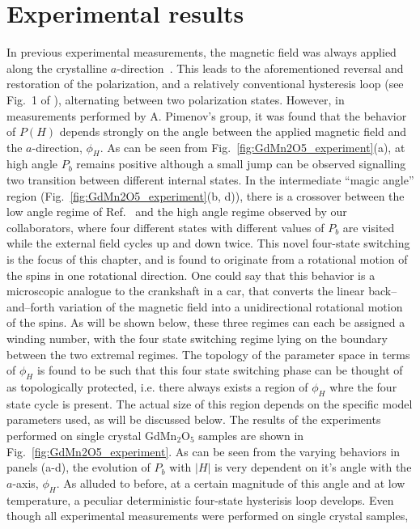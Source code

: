 \section{Experimental results}
In previous experimental measurements, the magnetic field was always applied along the crystalline $a$-direction~\cite{Lee13}.
This leads to the aforementioned reversal and restoration of the polarization, and a relatively conventional hysteresis loop (see Fig.~1 of \cite{Lee13}), alternating between two polarization states. However, in measurements performed by A. Pimenov's group, it was found that the behavior of $P(H)$ depends strongly on the angle between the applied magnetic field and the $a$-direction, $\phi_H$.
As can be seen from Fig.~\ref{fig:GdMn2O5_experiment}(a), at high angle $P_b$ remains positive although a small jump can be observed signalling two transition between different internal states.
In the intermediate ``magic angle'' region (Fig.~\ref{fig:GdMn2O5_experiment}(b, d)), there is a crossover between the low angle regime of Ref.~\cite{Lee13} and the high angle regime observed by our collaborators, where four different states with different values of $P_b$ are visited while the external field cycles up and down twice.
This novel four-state switching is the focus of this chapter, and is found to originate from a rotational motion of the spins in one rotational direction.
One could say that this behavior is a microscopic analogue to the crankshaft in a car, that converts the linear back--and--forth variation of the magnetic field into a unidirectional rotational motion of the spins.
As will be shown below, these three regimes can each be assigned a winding number, with the four state switching regime lying on the boundary between the two extremal regimes.
The topology of the parameter space in terms of $\phi_H$ is found to be such that this four state switching phase can be thought of as topologically protected, i.e. there always exists a region of $\phi_H$ whre the four state cycle is present. The actual size of this region depends on the specific model parameters used, as will be discussed below.
The results of the experiments performed on single crystal GdMn$_2$O$_5$ samples are shown in Fig.~\ref{fig:GdMn2O5_experiment}. As can be seen from the varying behaviors in panels (a-d), the evolution of $P_b$ with $|H|$ is very dependent on it's angle with the $a$-axis, $\phi_H$.
As alluded to before, at a certain magnitude of this angle and at low temperature, a peculiar deterministic four-state hysterisis loop develops.
Even though all experimental measurements were performed on single crystal samples, 
